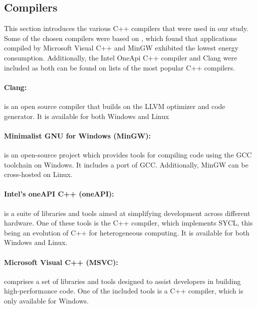 \subsection{Compilers}

This section introduces the various C++ compilers that were used in our study. Some of the chosen compilers were based on \cite{hassan2017}, which found that applications compiled by Microsoft Visual C++ and MinGW exhibited the lowest energy consumption. Additionally, the Intel OneApi C++ compiler and Clang were included as both can be found on lists of the most popular C++ compilers\cite{mycplus, educba, softwaretestinghelp}. 



\paragraph{Clang:} is an open source compiler that builds on the LLVM optimizer and code generator. It is available for both Windows and Linux\cite{clang}

\paragraph*{Minimalist GNU for Windows (MinGW):} is an open-source project which provides tools for compiling code using the GCC toolchain on Windows. It includes a port of GCC. Additionally, MinGW can be cross-hosted on Linux.\cite{mingw}


\paragraph*{Intel's oneAPI C++ (oneAPI):} is a suite of libraries and tools aimed at simplifying development across different hardware. One of these tools is the C++ compiler, which implements SYCL, this being an evolution of C++ for heterogeneous computing. It is available for both Windows and Linux.\cite{oneapi}

\paragraph*{Microsoft Visual C++ (MSVC):}  comprises a set of libraries and tools designed to assist developers in building high-performance code. One of the included tools is a C++ compiler, which is only available for Windows\cite{msvc}.